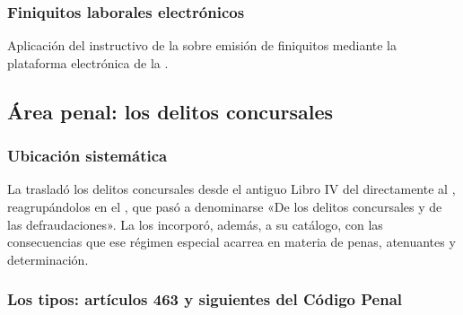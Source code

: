 \subsubsection{Finiquitos laborales electrónicos}

Aplicación del instructivo de la \superir{} sobre emisión de finiquitos mediante la
plataforma electrónica de la \dt{} \parencite{instructivo-i6}.

\subsection{Área penal: los delitos concursales}

\subsubsection{Ubicación sistemática}

La \LIR{} \citeyearpar{ley-20720} trasladó los delitos concursales desde el antiguo Libro IV
del \ccom{} directamente al \cpen{}, reagrupándolos en el , que pasó a denominarse «De los delitos concursales y de las
defraudaciones». La \Ldeleco{} \citeyearpar{ley-21595} los incorporó, además, a su catálogo,
con las consecuencias que ese régimen especial acarrea en materia de penas, atenuantes y
determinación.

\subsubsection{Los tipos: artículos 463 y siguientes del Código Penal}

